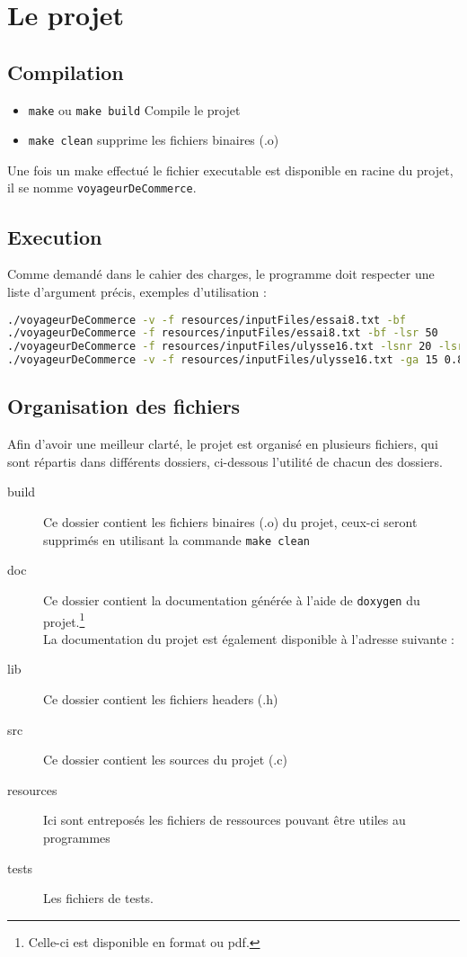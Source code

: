 \documentclass[a4paper, 11pt]{article}
\begin{document}
	\maketitle
	\section{Le projet}
	\subsection{Compilation}
	\begin{itemize}
		\item \texttt{make} ou \texttt{make build} Compile le projet
		\item \texttt{make clean} supprime les fichiers binaires (.o)
	\end{itemize}
	Une fois un make effectué le fichier executable est disponible en racine du projet, il se nomme \texttt{voyageurDeCommerce}. 	
	\subsection{Execution}
	Comme demandé dans le cahier des charges, le programme doit respecter une liste d'argument précis, exemples d'utilisation :
	\begin{lstlisting}[language=sh, basicstyle=\scriptsize\ttfamily, caption=Exemple d'execution du programme]
./voyageurDeCommerce -v -f resources/inputFiles/essai8.txt -bf
./voyageurDeCommerce -f resources/inputFiles/essai8.txt -bf -lsr 50
./voyageurDeCommerce -f resources/inputFiles/ulysse16.txt -lsnr 20 -lsr 50
./voyageurDeCommerce -v -f resources/inputFiles/ulysse16.txt -ga 15 0.8
	\end{lstlisting}
	\subsection{Organisation des fichiers}
	Afin d'avoir une meilleur clarté, le projet est organisé en plusieurs fichiers, qui sont répartis dans différents dossiers, ci-dessous l'utilité de chacun
	des dossiers.

	\begin{description}
		\item[{build}] Ce dossier contient les fichiers binaires (.o) du projet, ceux-ci seront supprimés en utilisant la commande
			\texttt{make clean} 
		\item[{doc}] Ce dossier contient la documentation générée à l'aide de \texttt{doxygen} du projet.\footnote{Celle-ci est disponible en format  ou
			pdf.} \\La documentation du projet est également disponible à l'adresse suivante : \\ 
		\item[{lib}] Ce dossier contient les fichiers headers (.h)
		\item[{src}] Ce dossier contient les sources du projet (.c) 
		\item[{resources}] Ici sont entreposés les fichiers de ressources pouvant être utiles au programmes 
		\item[{tests}] Les fichiers de tests. 
	\end{description}
\end{document}

